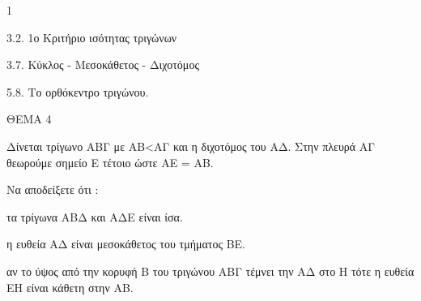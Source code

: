 \begin{ylh}{1}
    \item 3.2. 1ο Κριτήριο ισότητας τριγώνων
    \item 3.7. Κύκλος - Μεσοκάθετος - Διχοτόμος
    \item 5.8. Το ορθόκεντρο τριγώνου.
\end{ylh}

ΘΕΜΑ 4

Δίνεται τρίγωνο ΑΒΓ με ΑΒ\textless ΑΓ και η διχοτόμος του ΑΔ. Στην πλευρά ΑΓ θεωρούμε σημείο Ε τέτοιο ώστε ΑΕ = ΑΒ.

Να αποδείξετε ότι :

\begin{alist}
\item τα τρίγωνα ΑΒΔ και ΑΔΕ είναι ίσα. 

\item η ευθεία ΑΔ είναι μεσοκάθετος του τμήματος ΒΕ. 

\item αν το ύψος από την κορυφή Β του τριγώνου ΑΒΓ τέμνει την ΑΔ στο Η τότε η ευθεία ΕΗ είναι κάθετη στην ΑΒ. 


\end{alist}
